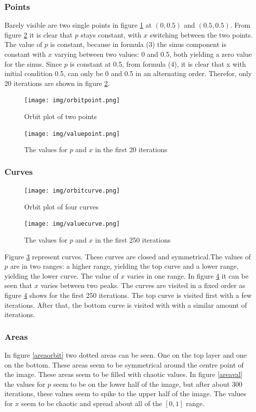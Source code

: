 \documentclass[a4paper,11pt]{article}
\begin{document}
\subsubsection{Points}
Barely visible are two single points in figure \ref{pointorbit} at $(0,0.5)$ and $(0.5,0.5)$. From figure \ref{pointval} it is clear that $p$ stays constant, with $x$ switching between the two points. The value of $p$ is constant, because in formula (3) the sinus component is constant with $x$ varying between two values: 0 and 0.5, both yielding a zero value for the sinus. Since $p$ is constant at 0.5, from formula (4), it is clear that x with initial condition 0.5, can only be 0 and 0.5 in an alternating order. Therefor, only 20 iterations are shown in figure \ref{pointval}.
\begin{figure}[H]
\centering
\texttt{[image: img/orbitpoint.png]}
\caption{Orbit plot of two points}
\label{pointorbit}
\end{figure}
\begin{figure}[H]
\centering
\texttt{[image: img/valuepoint.png]}
\caption{The values for $p$ and $x$ in the first 20 iterations}
\label{pointval}
\end{figure}

\subsubsection{Curves}
\begin{figure}[H]
\centering
\texttt{[image: img/orbitcurve.png]}
\caption{Orbit plot of four curves}
\label{curveorbit}
\end{figure}
\begin{figure}[H]
\centering
\texttt{[image: img/valuecurve.png]}
\caption{The values for $p$ and $x$ in the first 250 iterations }
\label{curveval}
\end{figure}

\newpage

Figure \ref{curveorbit} represent curves. These curves are closed and symmetrical.The values of $p$ are in two ranges: a higher range, yielding the top curve and a lower range, yielding the lower curve. The value of $x$ varies in one range. In figure \ref{curveval} it can be seen that $x$ varies between two peaks. The curves are visited in a fixed order as figure \ref{curveval} shows for the first 250 iterations. The top curve is visited first with a few iterations. After that, the bottom curve is visited with with a similar amount of iterations.

\subsubsection{Areas}
In figure \ref{areaorbit} two dotted areas can be seen. One on the top layer and one on the bottom. These areas seem to be symmetrical around the centre point of the image. These areas seem to be filled with chaotic values. In figure \ref{areaval} the values for $p$ seem to be on the lower half of the image, but after about 300 iterations, these values seem to spike to the upper half of the image. The values for $x$ seem to be chaotic and spread about all of the $[0,1]$ range.
\end{document}
